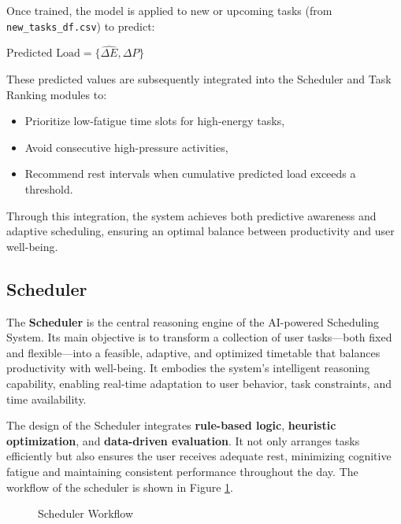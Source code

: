 \documentclass[12pt, a4paper]{article}
\begin{document}
            Once trained, the model is applied to new or upcoming tasks (from \texttt{new\_tasks\_df.csv}) to predict:
    
            \begin{center}
                $\text{Predicted Load} = \{\widehat{\Delta E}, \widehat{\Delta P}\}$
            \end{center}
    
            These predicted values are subsequently integrated into the Scheduler and Task Ranking modules to:
    
            \begin{itemize}
                \item Prioritize low-fatigue time slots for high-energy tasks,
                \item Avoid consecutive high-pressure activities,
                \item Recommend rest intervals when cumulative predicted load exceeds a threshold.
            \end{itemize}
    
            Through this integration, the system achieves both predictive awareness and adaptive scheduling, ensuring an optimal balance between productivity and user well-being.
    
    \subsection{Scheduler}
    
        The \textbf{Scheduler} is the central reasoning engine of the AI-powered Scheduling System. Its main objective is to transform a collection of user tasks—both fixed and flexible—into a feasible, adaptive, and optimized timetable that balances productivity with well-being. It embodies the system’s intelligent reasoning capability, enabling real-time adaptation to user behavior, task constraints, and time availability. 
        
        The design of the Scheduler integrates \textbf{rule-based logic}, \textbf{heuristic optimization}, and \textbf{data-driven evaluation}. It not only arranges tasks efficiently but also ensures the user receives adequate rest, minimizing cognitive fatigue and maintaining consistent performance throughout the day. The workflow of the scheduler is shown in Figure \ref{scheduler}. 

        \begin{figure}[H]
            \centering
            
            \caption{Scheduler Workflow}
            \label{scheduler}
        \end{figure}
\end{document}
